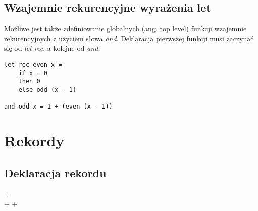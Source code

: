\documentclass[declaration,shortabstract]{iithesis}
\begin{document}


\subsection{Wzajemnie rekurencyjne wyrażenia let}

Możliwe jest także zdefiniowanie globalnych (ang. top level) funkcji wzajemnie 
rekurencyjnych z użyciem słowa \textit{and}. Deklaracja pierwszej funkcji 
musi zaczynać się od \textit{let rec}, a kolejne od \textit{and}.

\begin{lstlisting}[frame=single, caption=Funkcje wzajemnie rekurencyjne.]
let rec even x = 
    if x = 0
    then 0
    else odd (x - 1)

and odd x = 1 + (even (x - 1))
\end{lstlisting}




\section{Rekordy}

\subsection{Deklaracja rekordu}

\begin{bnf*}
    {   \bnfts{=}  
      +  
    }\\
    {  \bnfts{:} +
       \bnfor {} \bnfts{:} +
      \bnfts{;}
    }\\
\end{bnf*}
\end{document}
